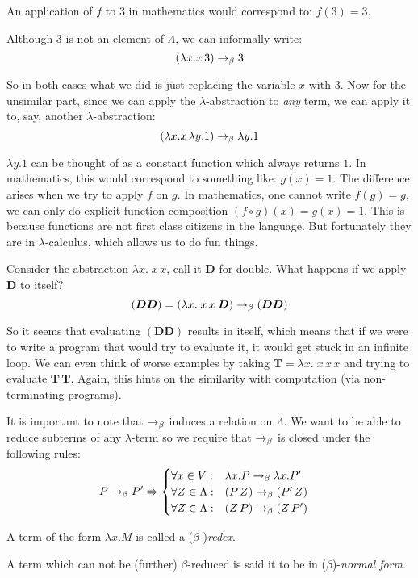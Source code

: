 An application of $f$ to $3$ in mathematics would correspond to: $f(3) = 3$.

Although $3$ is not an element of $\Lambda$, we can informally write:
    \[ (\lambda x. x\, 3) \rightarrow_\beta 3 \]

So in both cases what we did is just replacing the variable $x$ with $3$. Now
for the unsimilar part, since we can apply the $\lambda$-abstraction to
\emph{any} term, we can apply it to, say, another $\lambda$-abstraction:
    \[ (\lambda x. x\, \lambda y. 1) \rightarrow_\beta \lambda y. 1 \]

$\lambda y. 1$ can be thought of as a constant function which always returns
$1$.  In mathematics, this would correspond to something like: $g(x) = 1$.  The
difference arises when we try to apply $f$ on $g$. In mathematics, one cannot
write $f(g) = g$, we can only do explicit function composition $(f \circ g)(x) =
g(x) = 1$. This is because functions are not first class citizens in the
language. But fortunately they are in $\lambda$-calculus, which allows us to do
fun things.

Consider the abstraction $\lambda x.\; x\, x$, call it $\bm{D}$ for double.
What happens if we apply $\bm{D}$ to itself?
    \[ (\bm{D} \bm{D}) = (\lambda x.\; x\, x\: \bm{D})
        \rightarrow_\beta (\bm{D} \bm{D}) \]

So it seems that evaluating $(\bm{D} \bm{D})$ results in itself, which means
that if we were to write a program that would try to evaluate it, it would get
stuck in an infinite loop. We can even think of worse examples by taking
$\bm{T} = \lambda x.\; x\, x\,x$ and trying to evaluate $\bm{T}\, \bm{T}$.
Again, this hints on the similarity with computation (via non-terminating
programs).

It is important to note that $\rightarrow_\beta$ induces a relation on $\Lambda$. We
want to be able to reduce subterms of any $\lambda$-term so we require that
$\rightarrow_\beta$ is closed under the following rules:
\begin{align*}
    P \rightarrow_\beta P' &\Rightarrow
        \begin{cases}
            \forall x \in V: & \lambda x.P \rightarrow_\beta \lambda x. P' \\
            \forall Z \in \Lambda: & (P\, Z) \rightarrow_\beta (P'\, Z) \\
            \forall Z \in \Lambda: & (Z\, P) \rightarrow_\beta (Z\, P')
        \end{cases}
\end{align*}

\begin{definition}
    A term of the form $\lambda x. M$ is called a ($\beta$-)\emph{redex}.
\end{definition}
\begin{definition}
    A term which can not be (further) $\beta$-reduced is said it to be in
    ($\beta$)-\emph{normal form}.
\end{definition}


